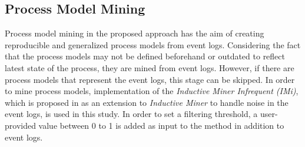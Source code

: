 \subsection{Process Model Mining}
\label{subsec:process-model-mining}
Process model mining in the proposed approach has the aim of creating reproducible and generalized process models from event logs. Considering the fact that the process models may not be defined beforehand or outdated to reflect latest state of the process, they are mined from event logs. However, if there are process models that represent the event logs, this stage can be skipped. In order to mine process models, implementation of the \textit{Inductive Miner Infrequent (IMi)}, which is proposed in \cite{leemans2014discoveringinfrequent} as an extension to \textit{Inductive Miner} to handle noise in the event logs, is used in this study. In order to set a filtering threshold, a user-provided value between 0 to 1 is added as input to the method in addition to event logs.

